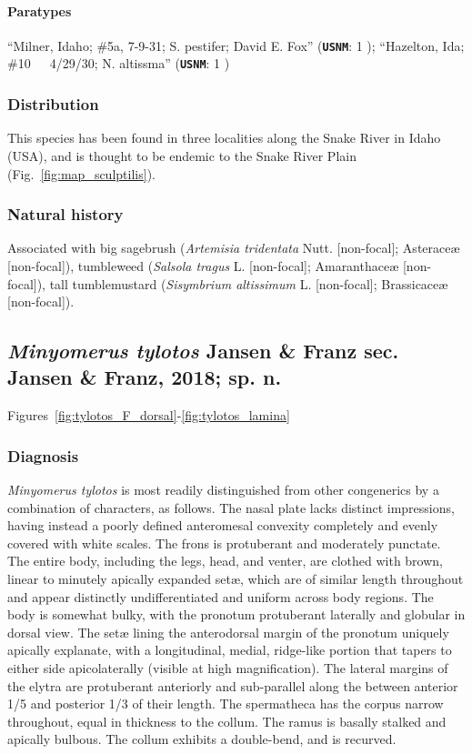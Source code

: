 \documentclass[fleqn,10pt,lineno]{wlpeerj} %
\begin{document}
			\paragraph{Paratypes}
				``Milner, Idaho; \#5a, 7-9-31; S. pestifer; David E. Fox'' (\texttt{\textbf{USNM}}: 1 \female);
				``Hazelton, Ida; \#10~~~4/29/30; N. altissma'' (\texttt{\textbf{USNM}}: 1 \male)
		\subsubsection*{Distribution}
			This species has been found in three localities along the Snake River in Idaho (USA), and is thought to be endemic to the Snake River Plain (Fig.~\ref{fig:map_sculptilis}).
		\subsubsection*{Natural history}
			Associated with big sagebrush (\textit{Artemisia tridentata} Nutt. [non-focal]; Asterace{\ae} [non-focal]), tumbleweed (\textit{Salsola tragus} L. [non-focal]; Amaranthace{\ae} [non-focal]), tall tumblemustard (\textit{Sisymbrium altissimum} L. [non-focal]; Brassicace{\ae} [non-focal]).

	\subsection*{\textit{Minyomerus tylotos} Jansen \& Franz sec. Jansen \& Franz, 2018; sp. n.}\label{ssec:tylotos}
		Figures~\ref{fig:tylotos_F_dorsal}-\ref{fig:tylotos_lamina}
		\subsubsection*{Diagnosis}
			\textit{Minyomerus tylotos} is most readily distinguished from other congenerics by a combination of characters, as follows.
			The nasal plate lacks distinct impressions, having instead a poorly defined anteromesal convexity completely and evenly covered with white scales.
			The frons is protuberant and moderately punctate.
			The entire body, including the legs, head, and venter, are clothed with brown, linear to minutely apically expanded set{\ae}, which are of similar length throughout and appear distinctly undifferentiated and uniform across body regions.
			The body is somewhat bulky, with the pronotum protuberant laterally and globular in dorsal view.
			The set{\ae} lining the anterodorsal margin of the pronotum uniquely apically explanate, with a longitudinal, medial, ridge-like portion that tapers to either side apicolaterally (visible at high magnification).
			The lateral margins of the elytra are protuberant anteriorly and sub-parallel along the between anterior 1/5 and posterior 1/3 of their length.
			The spermatheca has the corpus narrow throughout, equal in thickness to the collum.
			The ramus is basally stalked and apically bulbous.
			The collum exhibits a double-bend, and is recurved.
\end{document}

